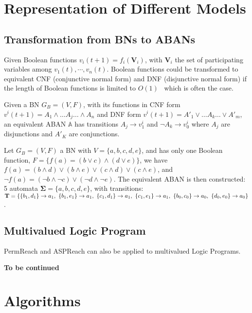 \chapter{Representation of Different Models}
\section{Transformation from BNs to ABANs}\label{appendix:trans}

Given Boolean functions $v_i(t+1)=f_i(\mathbf{V}_i)$, with $\mathbf{V}_i$ the set of participating variables among $v_1(t),\cdots,v_n(t)$.
Boolean functions could be transformed to equivalent CNF (conjunctive normal form) and DNF (disjunctive normal form) if the length of Boolean functions is limited to $O(1)$~\cite{miltersen2005converting} which is often the case.

\begin{proposition}
Given a BN $G_B=(V,F)$, with its functions in CNF form $v^i(t+1)=A_1\land\ldots A_j \ldots\land A_n$ and DNF form $v^i(t+1)=A'_1\lor\ldots A_k\ldots\lor A'_m$, an equivalent ABAN $\mathbb{A}$ has transitions $A_j\to v^i_1$ and $\lnot A_k\to v^i_0$ where $A_j$ are disjunctions and $A'_K$ are conjunctions.
\end{proposition}

\begin{example}
Let $G_B=(V,F)$ a BN with $V=\{a,b,c,d,e\}$, and has only one Boolean function, $F=\{f(a)= (b\lor c)\land(d\lor e)\}$, we have 
$f(a)=(b\land d)\lor(b\land e)\lor(c\land d)\lor(c\land e)$, and $\lnot f(a)=(\lnot b\land \lnot c)\lor(\lnot d\land \lnot e)$. 
The equivalent ABAN is then constructed: 5 automata $\mathbf{\Sigma}=\{a,b,c,d,e\}$, with transitions: $\mathbf{T}=\{\acm{b_1,d_1}{a_0}{a_1},\ \acm{b_1,e_1}{a_0}{a_1},\ \acm{c_1,d_1}{a_0}{a_1},\ \acm{c_1,e_1}{a_0}{a_1},\ \acm{b_0,c_0}{a_1}{a_0},\ \acm{d_0,e_0}{a_1}{a_0}\}$.
\end{example}

\section{Multivalued Logic Program}
PermReach and ASPReach can also be applied to multivalued Logic Programs.

\textbf{To be continued}

\chapter{Algorithms}\label{chap:algo}

